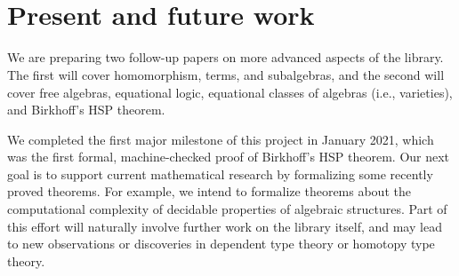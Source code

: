 \documentclass[a4paper,UKenglish,cleveref,autoref,thm-restate,11pt]{lipics-v2021}
\begin{document}
\begin{code}%
\>[1]\AgdaSpace{}%
\AgdaSymbol{:}\AgdaSpace{}%
\AgdaSymbol{\{}\AgdaSpace{}%
\AgdaSymbol{:}\AgdaSpace{}%
\AgdaSpace{}%
\AgdaSpace{}%
\AgdaSymbol{\}(}\AgdaSpace{}%
\AgdaSymbol{:}\AgdaSpace{}%
\AgdaSymbol{\{}\AgdaSymbol{\}\{}\AgdaSymbol{\}}\AgdaSpace{}%
\AgdaSymbol{)}\AgdaSpace{}%
\AgdaSpace{}%
\AgdaSpace{}%
\AgdaSymbol{(}\AgdaSpace{}%
\AgdaSpace{}%
\AgdaSpace{}%
\AgdaOperator{\AgdaFunction{/}}\AgdaSpace{}%
\AgdaSpace{}%
\AgdaSpace{}%
\AgdaSymbol{)(}\AgdaSpace{}%
\AgdaSpace{}%
\AgdaSpace{}%
\AgdaSymbol{)}\<%
\\
%
\\[\AgdaEmptyExtraSkip]%
%
\>[1]\AgdaSpace{}%
\AgdaSpace{}%
\AgdaSymbol{=}\AgdaSpace{}%
\AgdaSpace{}%
\AgdaSpace{}%
\AgdaSpace{}%
\AgdaSpace{}%
\AgdaSpace{}%
\AgdaSpace{}%
\<%
\end{code}





\section{Present and future work}\label{sec:conclusions-and-future-work}

We are preparing two follow-up papers on more advanced aspects of the library. The first will cover homomorphism, terms, and subalgebras, and the second will cover free algebras, equational logic, equational classes of algebras (i.e., varieties), and Birkhoff's HSP theorem.

We completed the first major milestone of this project in January 2021, which was the first formal, machine-checked proof of Birkhoff's HSP theorem.  Our next goal is to support current mathematical research by formalizing some recently proved theorems. For example, we intend to formalize theorems about the computational complexity of decidable properties of algebraic structures. Part of this effort will naturally involve further work on the library itself, and may lead to new observations or discoveries in dependent type theory or homotopy type theory.
\end{document}
